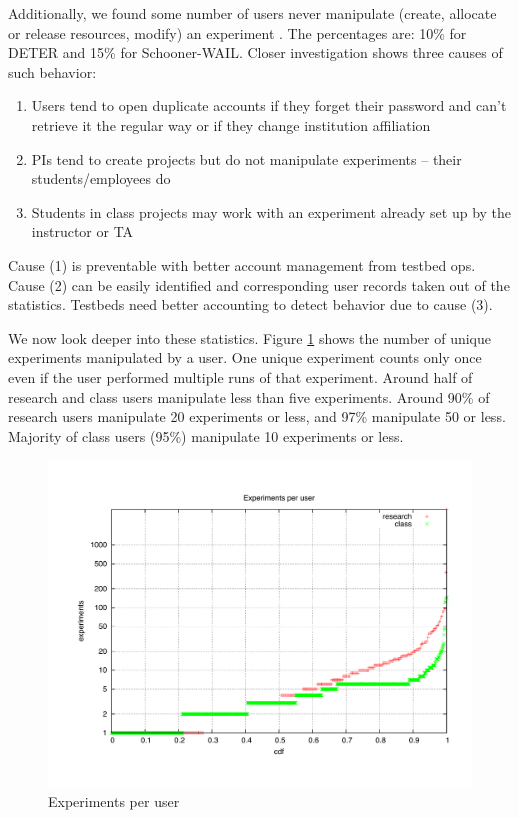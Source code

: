 \documentclass[10pt]{article}
\begin{document}
Additionally, we found 
 some number of users never manipulate 
  (create, allocate or release resources, modify) an experiment .
The percentages are: 10\% for DETER and 15\% for Schooner-WAIL. 
Closer investigation shows three causes of such behavior:
\begin{enumerate}
\item Users tend to open duplicate accounts if they forget their password and 
 can't retrieve it the regular way or if they change institution affiliation
\item PIs tend to create projects but do not manipulate experiments -- their students/employees do
\item Students in class projects may work with an experiment already 
 set up by the instructor or TA
\end{enumerate}
Cause (1) is preventable with better account management from testbed ops. Cause (2) can be easily identified and corresponding user records taken out of the statistics. Testbeds need better accounting to detect behavior due to cause (3). 

We now look deeper into these statistics. Figure \ref{uex} shows the number of unique experiments manipulated by a user. One unique experiment counts only once even if the user performed multiple runs of that experiment. Around half of research and class users manipulate less than five experiments. Around 90\% of research users manipulate 20 experiments or less, and 97\% manipulate 50 or less. Majority of class users (95\%) manipulate 10 experiments or less. 
 	
\begin{figure}[htbp]
\begin{center}
\includegraphics[width=5in]{figs/uex.pdf}
\caption{Experiments per user}
\label{uex}
\end{center}
\end{figure}
\end{document}

